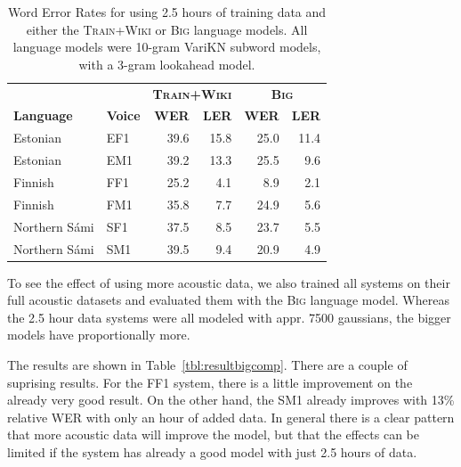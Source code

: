 \documentclass[b5paper]{article}
\newcommand{\ns}{Northern Sámi}
\newcommand{\ds}[1]{\textsc{#1}}
\begin{document}
\begin{table}[!h]
\centering
\begin{tabular}{ll|rr|rr}
 & & \multicolumn{2}{|c|}{\textbf{\ds{Train+Wiki}}}  & \multicolumn{2}{|c}{\textbf{\ds{Big}}}\\
\textbf{Language} & \textbf{Voice} & \textbf{WER} & \textbf{LER}& \textbf{{WER}} & \textbf{LER}\\\hline
Estonian & EF1 & 39.6 & 15.8 & 25.0 & 11.4\\
Estonian & EM1 & 39.2 & 13.3 & 25.5 & 9.6\\
Finnish & FF1 & 25.2 &4.1& 8.9 & 2.1  \\
Finnish & FM1 & 35.8 & 7.7 & 24.9 &  5.6 \\
\ns & SF1 & 37.5 & 8.5 & 23.7  & 5.5 \\
\ns & SM1 & 39.5 & 9.4& 20.9 & 4.9  \\
\end{tabular}
\caption{Word Error Rates for using 2.5 hours of training data and either the \ds{Train+Wiki} or \ds{Big} language models. All language models were 10-gram VariKN subword models, with a 3-gram lookahead model.\label{tbl:resultssmallcomp}}
\end{table}

To see the effect of using more acoustic data, we also trained all systems on their full acoustic datasets and evaluated them with the \ds{Big} language model. Whereas the 2.5 hour data systems were all modeled with appr. 7500 gaussians, the bigger models have proportionally more. 

The results are shown in Table~\ref{tbl:resultbigcomp}.  There are a couple of suprising results. For the FF1 system, there is a little improvement on the already very good result. On the other hand, the SM1 already improves with 13\% relative WER with only an hour of added data. In general there is a clear pattern that more acoustic data will improve the model, but that the effects can be limited if the system has already a good model with just 2.5 hours of data.



\end{document}
